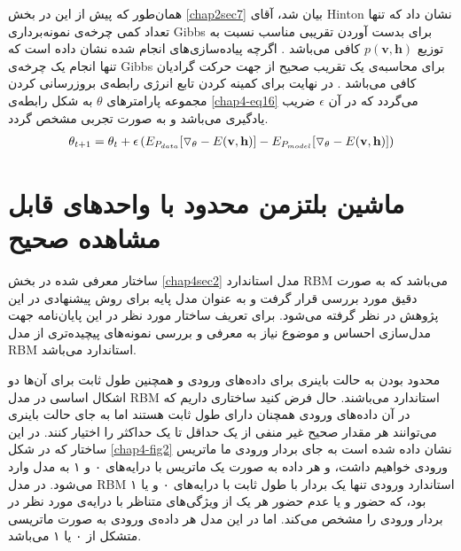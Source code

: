 همان‌طور که پیش از این در بخش
\ref{chap2sec7}
بیان شد، آقای
Hinton
نشان داد که تنها تعداد کمی‌ چرخه‌‌‌ی نمونه‌برداری
Gibbs
برای بدست آوردن تقریبی مناسب نسبت به توزیع
$p(\textbf{v},\textbf{h})$
کافی‌ می‌‌باشد
\cite{hinton2002training}\cite{carreira2005contrastive}.
اگرچه پیاده‌سازی‌های انجام شده نشان داده است که تنها انجام یک چرخه‌ی
Gibbs
برای محاسبه‌ی یک تقریب صحیح از جهت حرکت گرادیان کافی‌ می‌‌باشد
\cite{carreira2005contrastive}.
در نهایت برای کمینه کردن تابع انرژی رابطه‌ی بروز‌رسانی کردن مجموعه پارامتر‌های 
$\theta$
 به شکل رابطه‌ی
\ref{chap4-eq16}
می‌گردد که در آن
$\epsilon$
ضریب یادگیری می‌‌باشد و به صورت تجربی‌ مشخص گردد.
\begin{align}
	\centering
	\label{chap4-eq16}
	\theta_{t+1} = \theta_t + \epsilon \left( E_{P_{data}}[\triangledown_{\theta} -E(\textbf{v},\textbf{h})] - E_{P_{model}}[\triangledown_{\theta} -E(\textbf{v},\textbf{h})] \right) 
\end{align}

\section{ماشین بلتزمن محدود با واحدهای قابل مشاهده صحیح}
\label{chap4sec3}
ساختار معرفی‌ شده در بخش
\ref{chap4sec2}
مدل استاندارد
RBM
می‌باشد که به صورت دقیق مورد بررسی‌ قرار گرفت و به عنوان مدل پایه برای روش پیشنهادی در این پژوهش در نظر گرفته می‌‌شود. برای تعریف ساختار مورد نظر در این پایان‌‌نامه جهت مدل‌سازی احساس و موضوع نیاز به معرفی‌ و بررسی‌ نمونه‌های پیچیده‌تری از مدل
RBM
استاندارد می‌‌باشد.

محدود بودن به حالت باینری برای داده‌های ورودی و همچنین طول ثابت برای آن‌ها دو اشکال اساسی در مدل
RBM
استاندارد می‌‌باشند. حال فرض کنید ساختاری داریم که در آن داده‌های ورودی همچنان دارای طول ثابت هستند اما به جای حالت باینری می‌‌توانند هر مقدار صحیح غیر منفی‌ از یک حداقل تا یک حداکثر را اختیار کنند. در این ساختار که در شکل
\ref{chap4-fig2}
نشان داده شده است به جای بردار ورودی ما ماتریس ورودی خواهیم داشت، و هر داده به صورت یک ماتریس با درایه‌های ۰ و ۱ به مدل وارد می‌‌شود. در مدل
RBM
استاندارد ورودی تنها یک بردار با طول ثابت با درایه‌های ۰ و یا ۱ بود، که حضور و یا عدم حضور هر یک از ویژگی‌‌های متناظر با درایه‌ی مورد نظر در بردار ورودی را مشخص می‌‌کند. اما در این مدل هر داده‌ی ورودی به صورت ماتریسی متشکل از ۰ یا ۱ می‌‌باشد.

